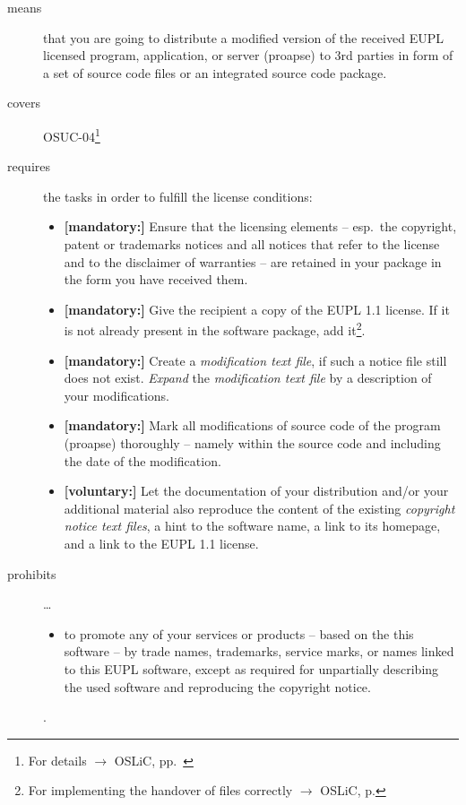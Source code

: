 \begin{description}
\item[means] that you are going to distribute a modified version of the received
EUPL licensed program, application, or server (proapse) to 3rd parties in form
of a set of source code files or an integrated source code package.
\item[covers] OSUC-04\footnote{For details $\rightarrow$ OSLiC, pp.\ \pageref{OSUC-04-DEF}}
\item[requires] the tasks in order to fulfill the license conditions:
\begin{itemize}
  
  \item \textbf{[mandatory:]} Ensure that the licensing elements -- esp.\ the
  copyright, patent or trademarks notices and all notices that refer to the
  license and to the disclaimer of warranties -- are retained in your package in
  the form you have received them.
  
  \item \textbf{[mandatory:]} Give the recipient a copy of the EUPL 1.1
  license. If it is not already present in the software package, add
  it\footnote{For implementing the handover of files correctly $\rightarrow$
  OSLiC, p. \pageref{DistributingFilesHint}}.

  \item \textbf{[mandatory:]} Create a \emph{modification text file}, if such a
  notice file still does not exist. \emph{Expand} the \emph{modification text
  file} by a description of your modifications.
    
  \item \textbf{[mandatory:]} Mark all modifications of source code of the
  program (proapse) thoroughly -- namely within the
  source code and including the date of the modification.
   
  \item \textbf{[voluntary:]} Let the documentation of your distribution and/or
  your additional material also reproduce the content of the existing
  \emph{copyright notice text files}, a hint to the software name, a link to its
  homepage, and a link to the EUPL 1.1 license.
  
 \end{itemize}
 
\item[prohibits] \ldots
\begin{itemize}
  \item to promote any of your services or products -- based on the this software
  -- by trade names, trademarks, service marks, or names linked to this EUPL
  software, except as required for unpartially describing the used software and
  reproducing the copyright notice.
\end{itemize}.

\end{description}

